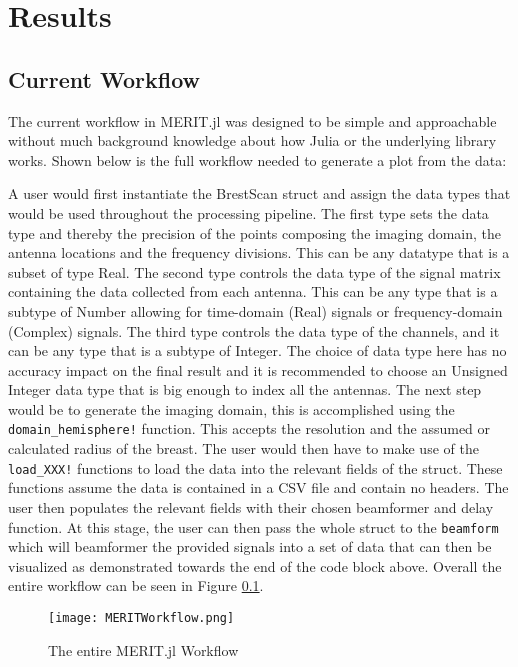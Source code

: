 \setcounter{chapter}{3}
\setcounter{section}{0}
\setcounter{subsection}{0}
\chapter*{Results}
\section{Current Workflow}
The current workflow in MERIT.jl was designed to be simple and approachable without much background knowledge about how
Julia or the underlying library works. Shown below is the full workflow needed to generate a plot from the data:

A user would first instantiate the BrestScan struct and assign the data types that would be used throughout the
processing pipeline. The first type sets the data type and thereby the precision of the points composing the imaging
domain, the antenna locations and the frequency divisions. This can be any datatype that is a subset of type Real. The
second type controls the data type of the signal matrix containing the data collected from each antenna. This can be any
type that is a subtype of Number allowing for time-domain (Real) signals or frequency-domain (Complex) signals. The
third type controls the data type of the channels, and it can be any type that is a subtype of Integer. The choice of
data type here has no accuracy impact on the final result and it is recommended to choose an Unsigned Integer data type
that is big enough to index all the antennas. The next step would be to generate the imaging domain, this is
accomplished using the \lstinline[language=Julia]{domain_hemisphere!} function. This accepts the resolution and the
assumed or calculated radius of the breast. The user would then have to make use of the
\lstinline[language=Julia]{load_XXX!} functions to load the data into the relevant fields of the struct. These functions
assume the data is contained in a CSV file and contain no headers. The user then populates the relevant fields with
their chosen beamformer and delay function. At this stage, the user can then pass the whole struct to the
\lstinline[language=Julia]{beamform} which will beamformer the provided signals into a set of data that can then be
visualized as demonstrated towards the end of the code block above. Overall the entire workflow can be seen in Figure
\ref{fig:MERITWorkflow}.

\begin{figure}[h!]
    \texttt{[image: MERITWorkflow.png]}
    \centering
    \caption{The entire MERIT.jl Workflow} 
    \label{fig:MERITWorkflow}
\end{figure}

